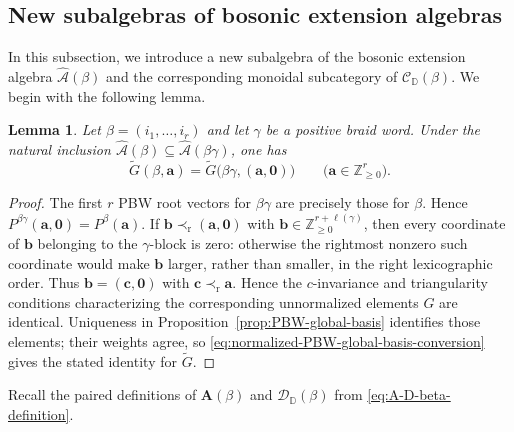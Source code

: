 \documentclass[12pt, reqno]{amsart}
\theoremstyle{plain}
\newtheorem{lemma}[theorem]{Lemma}
\theoremstyle{definition}
\numberwithin{equation}{section}
\newcommand{\ZZ}{\mathbb{Z}}
\newcommand{\DD}{\mathbb{D}}
\newcommand{\cA}{\mathcal{A}}
\begin{document}
\subsection{New subalgebras of bosonic extension algebras}

In this subsection, we introduce a new subalgebra of the bosonic
extension algebra \(\widehat{\cA}(\beta)\) and the corresponding
monoidal subcategory of \(\mathscr C_{\DD}(\beta)\). We begin with
the following lemma.

\begin{lemma}\label{lem:global-basis-extension-by-zero}
Let \(\beta=(i_1,\ldots,i_r)\) and let \(\gamma\) be a positive braid
word. Under the natural inclusion
\(\widehat{\cA}(\beta)\subseteq\widehat{\cA}(\beta\gamma)\), one has
\begin{equation}\label{eq:global-basis-extension-by-zero}
    \widetilde G(\beta,\mathbf a)
    =\widetilde G\bigl(\beta\gamma,(\mathbf a,\boldsymbol 0)\bigr)
    \qquad
    \bigl(\mathbf a\in\ZZ_{\geq0}^{r}\bigr).
\end{equation}
\end{lemma}

\begin{proof}
The first \(r\) PBW root vectors for \(\beta\gamma\) are precisely those
for \(\beta\). Hence
\(P^{\beta\gamma}(\mathbf a,\boldsymbol 0)=P^\beta(\mathbf a)\).
If
\(\mathbf b\prec_{\mathrm r}(\mathbf a,\boldsymbol 0)\) with
\(\mathbf b\in\ZZ_{\geq0}^{r+\ell(\gamma)}\), then every coordinate of
\(\mathbf b\) belonging to the \(\gamma\)-block is zero: otherwise the
rightmost nonzero such coordinate would make \(\mathbf b\) larger, rather
than smaller, in the right lexicographic order. Thus
\(\mathbf b=(\mathbf c,\boldsymbol 0)\) with
\(\mathbf c\prec_{\mathrm r}\mathbf a\). Hence the
\(c\)-invariance and triangularity conditions characterizing the
corresponding unnormalized elements \(G\) are identical. Uniqueness
in Proposition~\ref{prop:PBW-global-basis} identifies those elements;
their weights agree, so
\eqref{eq:normalized-PBW-global-basis-conversion} gives the stated
identity for \(\widetilde G\).
\end{proof}

Recall the paired definitions of \(\mathbf A(\beta)\) and
\(\mathscr D_{\DD}(\beta)\) from
\eqref{eq:A-D-beta-definition}.
\end{document}
